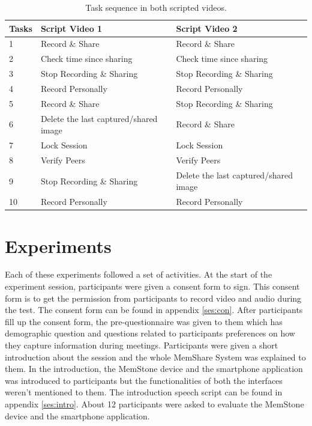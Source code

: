 \documentclass[mscthesis]{usiinfthesis}
\begin{document}
\begin{table}[!ht]
\centering
\begin{tabular}{|l|l|l|}
\hline
\textbf{Tasks} & \textbf{Script Video 1} & \textbf{Script Video 2} \\ \hline
1 & Record \& Share & Record \& Share \\ \hline
2 & Check time since sharing & Check time since sharing \\ \hline
3 & Stop Recording \& Sharing & Stop Recording \& Sharing \\ \hline
4 & Record Personally & Record Personally \\ \hline
5 & Record \& Share & Stop Recording \& Sharing \\ \hline
6 & Delete the last captured/shared image & Record \& Share \\ \hline
7 & Lock Session & Lock Session \\ \hline
8 & Verify Peers & Verify Peers \\ \hline
9 & Stop Recording \& Sharing & Delete the last captured/shared image \\ \hline
10 & Record Personally & Record Personally \\ \hline
\end{tabular}
\caption{Task sequence in both scripted videos.}
\label{tab8}
\end{table}
 

\section{Experiments}
Each of these experiments followed a set of activities. At the start of the experiment session, participants were given a consent form to sign. This consent form is to get the permission from participants to record video and audio during the test. The consent form can be found in appendix \ref{ses:con}. After participants fill up the consent form, the pre-questionnaire was given to them which has demographic question and questions related to participants preferences on how they capture information during meetings. Participants were given a short introduction about the session and the whole MemShare System was explained to them. In the introduction, the MemStone device and the smartphone application was introduced to participants but the functionalities of both the interfaces weren't mentioned to them. The introduction speech script can be found in appendix \ref{ses:intro}. About 12 participants were asked to evaluate the MemStone device and the smartphone application. 
\end{document}
